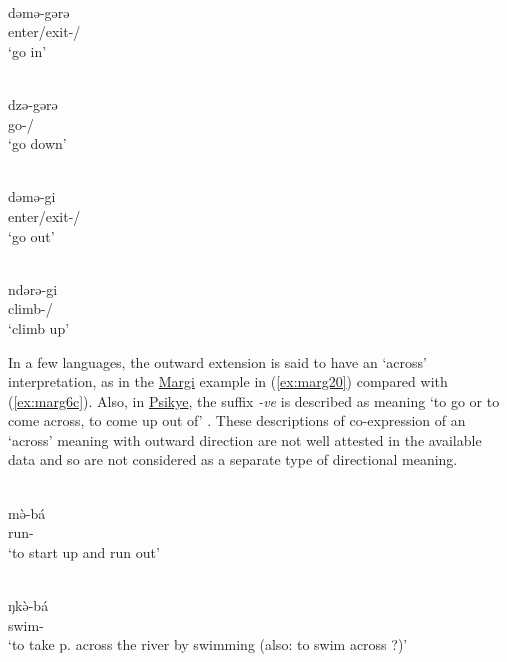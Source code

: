 \ea\label{ex:gude6}
 \\
\gll dəmə-gərə	\\
enter/exit-/ \\	
\glt `go in'

\ex\label{ex:gude7}
 \\
\gll dzə-gərə	\\
go-/	\\
\glt `go down'

\ex\label{ex:gude8}
 \\
\gll dəmə-gi \\
enter/exit-/	\\
\glt `go out'

\ex\label{ex:gude9}
 \\
\gll ndərə-gi	\\
climb-/ \\
\glt `climb up'
\z 

In a few languages, the outward extension is said to have an `across' interpretation, as in the \hyperref[marg]{Margi} example in (\ref{ex:marg20}) compared with (\ref{ex:marg6c}). Also, in \hyperref[psik]{Psikye}, the suffix \textit{-ve} is described as meaning `to go or to come across, to come up out of' \citep[118]{smithKapsikiLanguage1969}. These descriptions of co-expression of an `across' meaning with outward direction are not well attested in the available data and so are not considered as a separate type of directional meaning. 

\ea\label{ex:marg6c}
 \\
\gll mə̀-bá	\\
run-		\\
\glt `to start up and run out'

\ex\label{ex:marg20}
 \\
\gll ŋkə̀-bá \\
swim- \\
\glt `to take p. across the river by swimming (also: to swim across ?)'
\z 

